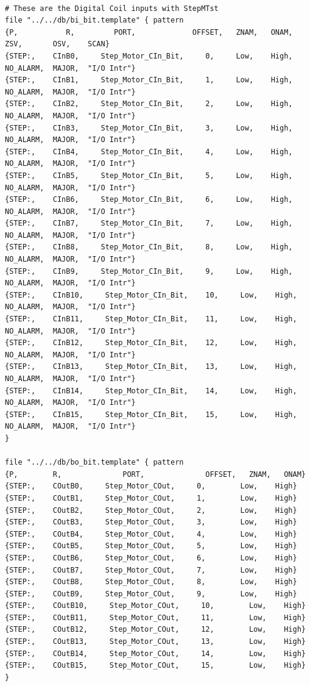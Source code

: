 \documentclass[11pt
  , a4paper
  , article
  , oneside
]{memoir}
\begin{document}
\begin{lstlisting}[style=termstyle]

# These are the Digital Coil inputs with StepMTst
file "../../db/bi_bit.template" { pattern
{P,           R,         PORT,             OFFSET,   ZNAM,   ONAM,  ZSV,       OSV,    SCAN}
{STEP:,    CInB0,     Step_Motor_CIn_Bit,     0,     Low,    High,  NO_ALARM,  MAJOR,  "I/O Intr"}
{STEP:,    CInB1,     Step_Motor_CIn_Bit,     1,     Low,    High,  NO_ALARM,  MAJOR,  "I/O Intr"}
{STEP:,    CInB2,     Step_Motor_CIn_Bit,     2,     Low,    High,  NO_ALARM,  MAJOR,  "I/O Intr"}
{STEP:,    CInB3,     Step_Motor_CIn_Bit,     3,     Low,    High,  NO_ALARM,  MAJOR,  "I/O Intr"}
{STEP:,    CInB4,     Step_Motor_CIn_Bit,     4,     Low,    High,  NO_ALARM,  MAJOR,  "I/O Intr"}
{STEP:,    CInB5,     Step_Motor_CIn_Bit,     5,     Low,    High,  NO_ALARM,  MAJOR,  "I/O Intr"}
{STEP:,    CInB6,     Step_Motor_CIn_Bit,     6,     Low,    High,  NO_ALARM,  MAJOR,  "I/O Intr"}
{STEP:,    CInB7,     Step_Motor_CIn_Bit,     7,     Low,    High,  NO_ALARM,  MAJOR,  "I/O Intr"}
{STEP:,    CInB8,     Step_Motor_CIn_Bit,     8,     Low,    High,  NO_ALARM,  MAJOR,  "I/O Intr"}
{STEP:,    CInB9,     Step_Motor_CIn_Bit,     9,     Low,    High,  NO_ALARM,  MAJOR,  "I/O Intr"}
{STEP:,    CInB10,     Step_Motor_CIn_Bit,    10,     Low,    High,  NO_ALARM,  MAJOR,  "I/O Intr"}
{STEP:,    CInB11,     Step_Motor_CIn_Bit,    11,     Low,    High,  NO_ALARM,  MAJOR,  "I/O Intr"}
{STEP:,    CInB12,     Step_Motor_CIn_Bit,    12,     Low,    High,  NO_ALARM,  MAJOR,  "I/O Intr"}
{STEP:,    CInB13,     Step_Motor_CIn_Bit,    13,     Low,    High,  NO_ALARM,  MAJOR,  "I/O Intr"}
{STEP:,    CInB14,     Step_Motor_CIn_Bit,    14,     Low,    High,  NO_ALARM,  MAJOR,  "I/O Intr"}
{STEP:,    CInB15,     Step_Motor_CIn_Bit,    15,     Low,    High,  NO_ALARM,  MAJOR,  "I/O Intr"}
}

file "../../db/bo_bit.template" { pattern
{P,        R,              PORT,              OFFSET,   ZNAM,   ONAM}
{STEP:,    COutB0,     Step_Motor_COut,     0,        Low,    High}
{STEP:,    COutB1,     Step_Motor_COut,     1,        Low,    High}
{STEP:,    COutB2,     Step_Motor_COut,     2,        Low,    High}
{STEP:,    COutB3,     Step_Motor_COut,     3,        Low,    High}
{STEP:,    COutB4,     Step_Motor_COut,     4,        Low,    High}
{STEP:,    COutB5,     Step_Motor_COut,     5,        Low,    High}
{STEP:,    COutB6,     Step_Motor_COut,     6,        Low,    High}
{STEP:,    COutB7,     Step_Motor_COut,     7,        Low,    High}
{STEP:,    COutB8,     Step_Motor_COut,     8,        Low,    High}
{STEP:,    COutB9,     Step_Motor_COut,     9,        Low,    High}
{STEP:,    COutB10,     Step_Motor_COut,     10,        Low,    High}
{STEP:,    COutB11,     Step_Motor_COut,     11,        Low,    High}
{STEP:,    COutB12,     Step_Motor_COut,     12,        Low,    High}
{STEP:,    COutB13,     Step_Motor_COut,     13,        Low,    High}
{STEP:,    COutB14,     Step_Motor_COut,     14,        Low,    High}
{STEP:,    COutB15,     Step_Motor_COut,     15,        Low,    High}
}


\end{lstlisting}
\end{document}

